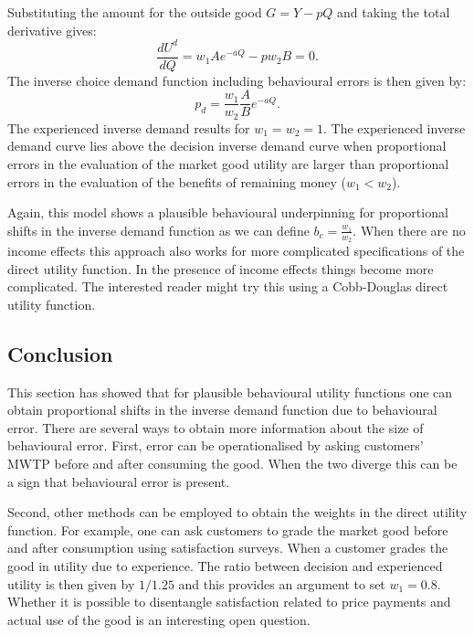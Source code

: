 \documentclass[
]{book}
\begin{document}
Substituting the amount for the outside good \(G=Y-pQ\) and taking the total derivative gives:
\begin{equation}
\frac{dU^d}{dQ} = w_1 A e^{-aQ} - p w_2 B = 0.
\end{equation}
The inverse choice demand function including behavioural errors is then given by:
\begin{equation}
p_d = \frac{w_1}{w_2}\frac{A}{B}e^{-aQ}.
\end{equation}
The experienced inverse demand results for \(w_1=w_2=1\). The experienced inverse demand curve lies above the decision inverse demand curve when proportional errors in the evaluation of the market good utility are larger than proportional errors in the evaluation of the benefits of remaining money (\(w_1<w_2\)).

Again, this model shows a plausible behavioural underpinning for proportional shifts in the inverse demand function as we can define \(b_c=\frac{w_1}{w_2}\). When there are no income effects this approach also works for more complicated specifications of the direct utility function. In the presence of income effects things become more complicated. The interested reader might try this using a Cobb-Douglas direct utility function.

\hypertarget{conclusion-1}{%
\subsection{Conclusion}\label{conclusion-1}}

This section has showed that for plausible behavioural utility functions one can obtain proportional shifts in the inverse demand function due to behavioural error. There are several ways to obtain more information about the size of behavioural error. First, error can be operationalised by asking customers' MWTP before and after consuming the good. When the two diverge this can be a sign that behavioural error is present.

Second, other methods can be employed to obtain the weights in the direct utility function. For example, one can ask customers to grade the market good before and after consumption using satisfaction surveys. When a customer grades the good in utility due to experience. The ratio between decision and experienced utility is then given by \(1/1.25\) and this provides an argument to set \(w_1=0.8\). Whether it is possible to disentangle satisfaction related to price payments and actual use of the good is an interesting open question.
\end{document}
